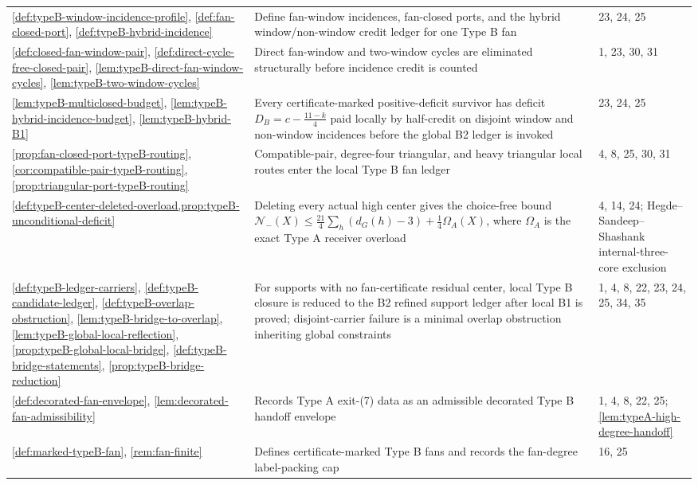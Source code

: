 \documentclass[11pt]{article}
\newcommand{\No}{\mathcal N}
\begin{document}
{\begin{longtable}{L{0.31\textwidth} L{0.42\textwidth} L{0.17\textwidth}}
\cref{def:typeB-window-incidence-profile}, \cref{def:fan-closed-port}, \cref{def:typeB-hybrid-incidence} & Define fan-window incidences, fan-closed ports, and the hybrid window/non-window credit ledger for one Type B fan & 23, 24, 25 \\
\cref{def:closed-fan-window-pair}, \cref{def:direct-cycle-free-closed-pair}, \cref{lem:typeB-direct-fan-window-cycles}, \cref{lem:typeB-two-window-cycles} & Direct fan-window and two-window cycles are eliminated structurally before incidence credit is counted & 1, 23, 30, 31 \\
\cref{lem:typeB-multiclosed-budget}, \cref{lem:typeB-hybrid-incidence-budget}, \cref{lem:typeB-hybrid-B1} & Every certificate-marked positive-deficit survivor has deficit $D_B=c-\frac{11-k}{4}$ paid locally by half-credit on disjoint window and non-window incidences before the global B2 ledger is invoked & 23, 24, 25 \\
\cref{prop:fan-closed-port-typeB-routing}, \cref{cor:compatible-pair-typeB-routing}, \cref{prop:triangular-port-typeB-routing} & Compatible-pair, degree-four triangular, and heavy triangular local routes enter the local Type B fan ledger & 4, 8, 25, 30, 31 \\
\cref{def:typeB-center-deleted-overload,prop:typeB-unconditional-deficit} & Deleting every actual high center gives the choice-free bound \(\No_-(X)\le\frac{21}{4}\sum_h(d_G(h)-3)+\frac14\Omega_A(X)\), where \(\Omega_A\) is the exact Type A receiver overload & 4, 14, 24; Hegde--Sandeep--Shashank internal-three-core exclusion \\
\cref{def:typeB-ledger-carriers}, \cref{def:typeB-candidate-ledger}, \cref{def:typeB-overlap-obstruction}, \cref{lem:typeB-bridge-to-overlap}, \cref{lem:typeB-global-local-reflection}, \cref{prop:typeB-global-local-bridge}, \cref{def:typeB-bridge-statements}, \cref{prop:typeB-bridge-reduction} & For supports with no fan-certificate residual center, local Type B closure is reduced to the B2 refined support ledger after local B1 is proved; disjoint-carrier failure is a minimal overlap obstruction inheriting global constraints & 1, 4, 8, 22, 23, 24, 25, 34, 35 \\
\cref{def:decorated-fan-envelope}, \cref{lem:decorated-fan-admissibility} & Records Type A exit-(7) data as an admissible decorated Type B handoff envelope & 1, 4, 8, 22, 25; \cref{lem:typeA-high-degree-handoff} \\
\cref{def:marked-typeB-fan}, \cref{rem:fan-finite} & Defines certificate-marked Type B fans and records the fan-degree label-packing cap & 16, 25 \\

\end{longtable}}
\end{document}
